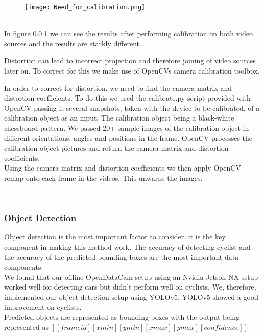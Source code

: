 \begin{figure}[h]
  \texttt{[image: Need\_for\_calibration.png]}
  \centering 
  \end{figure}
  \label{joined_distortion}
\ \\

In figure \ref{} we can see the results after performing calibration on both video sources and the results are starkly different.

Distortion can lead to incorrect projection and therefore joining of video sources later on.
To correct for this we make use of OpenCVs \cite{noauthor_opencv/opencv_2021} camera calibration toolbox.

In order to correct for distortion, we need to find the camera matrix and distortion coefficients. To do this we used the calibrate.py script provided with OpenCV
passing it several snapshots, taken with the device to be calibrated, of a calibration object as an input. The calibration object being a black-white chessboard pattern.
We passed 20+ sample images of the calibration object in different orientations, angles and positions in the frame. OpenCV processes the calibration object pictures and
return the camera matrix and distortion coefficients.
\ \\
Using the camera matrix and distortion coefficients we then apply OpenCV remap onto each frame in the videos. This unwarps the images.

\ \\
\subsubsection{Object Detection}

Object detection is the most important factor to consider, it is the key component in making this method work. The accuracy of detecting cyclist and the accuracy of the
predicted bounding boxes are the most important data components.
\ \\

We found that our offline OpenDataCam setup using an Nvidia Jetson NX setup worked well for detecting cars but didn't perform well on cyclists. 
We, therefore, implemented our object detection setup using
YOLOv5. YOLOv5 showed a good improvement on cyclists.
\ \\ 
Predicted objects are represented as bounding boxes with the output being represented as $[[frame id][xmin][ymin][xmax][ymax][confidence]]$

